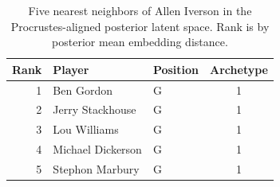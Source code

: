 \begin{table}[htbp]
  \centering\small
  \begin{tabular}{rllc}
    \toprule
    Rank & Player & Position & Archetype \\
    \midrule
    1 & Ben Gordon & G & 1 \\
    2 & Jerry Stackhouse & G & 1 \\
    3 & Lou Williams & G & 1 \\
    4 & Michael Dickerson & G & 1 \\
    5 & Stephon Marbury & G & 1 \\
    \bottomrule
  \end{tabular}
  \caption{Five nearest neighbors of Allen Iverson in the Procrustes-aligned posterior latent space. Rank is by posterior mean embedding distance.}
  \label{tab:Allen_Iverson_neighbors}
\end{table}

